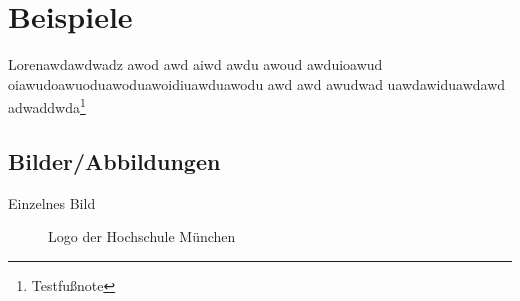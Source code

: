 \documentclass[\mainsize, a4paper, fleqn, xcolor=dvipsnames]{scrartcl}
\begin{document}
	\renewcommand{\sectionautorefname}{Kapitel}
	\renewcommand{\subsectionautorefname}{Abschnitt}
	\renewcommand{\subsubsectionautorefname}{Unterabschnitt}
	
	
	
	
	\restoregeometry
	
	\newpage
	\thispagestyle{empty}
	\mbox{}
	\newpage
	
	\pagestyle{fancy}
	
	

	\section{Beispiele}\label{sec:beispiel}
	
	Lorenawdawdwadz awod awd aiwd awdu awoud awduioawud oiawudoawuoduawoduawoidiuawduawodu awd awd awudwad uawdawiduawdawd adwaddwda\footnote{Testfußnote}
	
	\subsection{Bilder/Abbildungen}\label{subsec:abbildungen}
	
	Einzelnes Bild
	
	\begin{figure}[H]
		\centering
		\begin{minipage}{0.6\textwidth}
			\centering
		\end{minipage}
		\caption{Logo der Hochschule München}
  		\label{fig:logo}
	\end{figure}
	
\end{document}
